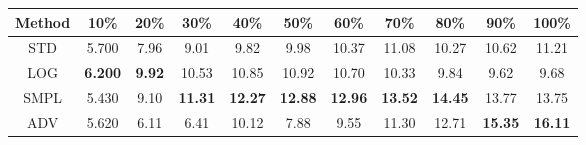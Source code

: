 \documentclass{standalone}
\begin{document}
\begin{tabular}{c|cccccccccc}
      \toprule
      Method & 10\% & 20\% & 30\% & 40\% & 50\% & 60\% & 70\% & 80\% & 90\% & 100\% \\
      \midrule
STD & 5.700 & 7.96 & 9.01 & 9.82 & 9.98 & 10.37 & 11.08 & 10.27 & 10.62 & 11.21\\
LOG & \textbf{6.200} & \textbf{9.92} & 10.53 & 10.85 & 10.92 & 10.70 & 10.33 & 9.84 & 9.62 & 9.68\\
SMPL & 5.430 & 9.10 & \textbf{11.31} & \textbf{12.27} & \textbf{12.88} & \textbf{12.96} & \textbf{13.52} & \textbf{14.45} & 13.77 & 13.75\\
ADV & 5.620 & 6.11 & 6.41 & 10.12 & 7.88 & 9.55 & 11.30 & 12.71 & \textbf{15.35} & \textbf{16.11}\\
  \bottomrule
\end{tabular}
\end{document}
